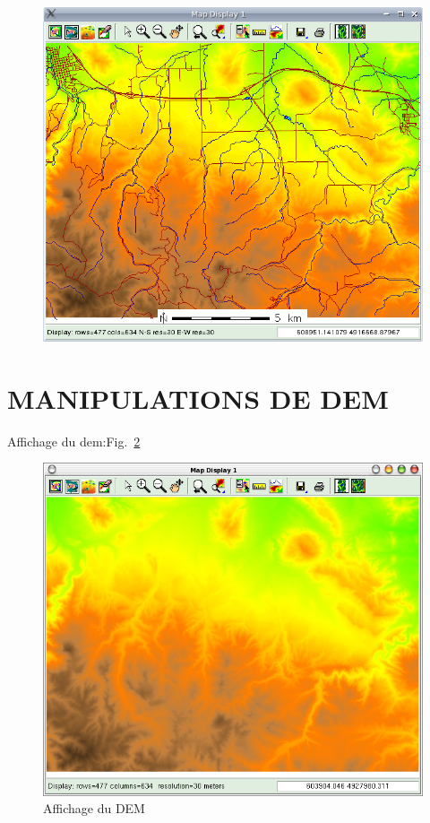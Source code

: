 \begin{figure}[htbp]
   \centering
   \includegraphics[scale=0.35]{grass008.png}
   \caption{}
   \label{fig:grass008}
\end{figure}

\section{MANIPULATIONS DE DEM}
Affichage du dem:Fig.~\ref{fig:grass009}

\begin{figure}[htbp]
   \centering
   \includegraphics[scale=0.35]{grass009.png}
   \caption{Affichage du DEM}
   \label{fig:grass009}
\end{figure}

